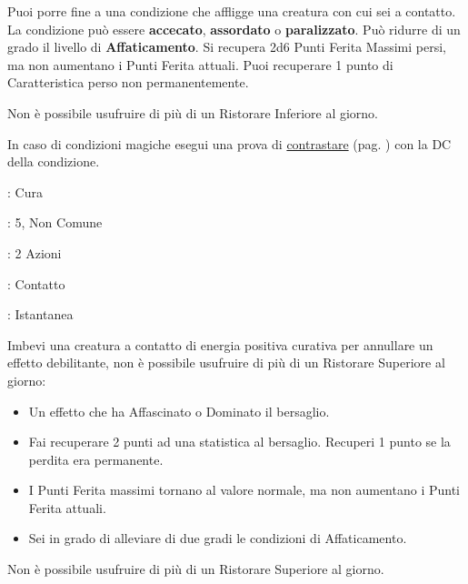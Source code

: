 \begin{multicols}{2}
Puoi porre fine a una condizione che affligge una creatura con cui sei a contatto. La condizione può essere \textbf{accecato}, \textbf{assordato} o \textbf{paralizzato}. Può ridurre di un grado il livello di \textbf{Affaticamento}. Si recupera 2d6 Punti Ferita Massimi persi, ma non aumentano i Punti Ferita attuali. Puoi recuperare 1 punto di Caratteristica perso non permanentemente.

Non è possibile usufruire di più di un Ristorare Inferiore al giorno.

In caso di condizioni magiche esegui una prova di \hyperlink{contrastareincantesimi}{contrastare} (pag. \pageref{contrastareincantesimi}) con la DC della condizione.

\noindent\colorbox{OBSSgold!10}{
\begin{minipage}{0.95\linewidth}
\begin{description}[noitemsep, topsep=0pt, parsep=0pt, partopsep=0pt, leftmargin=0cm, labelwidth=1.3cm]
	\item[\textbf{Lista}]: Cura
	\item[\textbf{Livello}]: 5, Non Comune
	\item[\textbf{Lancio}]: 2 Azioni
	\item[\textbf{Gittata}]: Contatto
	\item[\textbf{Durata}]: Istantanea
\end{description}
\end{minipage}}\smallskip

Imbevi una creatura a contatto di energia positiva curativa per annullare un effetto debilitante, non è possibile usufruire di più di un Ristorare Superiore al giorno:

\begin{itemize}[leftmargin=*] \setlength{\itemsep}{0pt}

	\item Un effetto che ha Affascinato o Dominato il bersaglio.
	\item Fai recuperare 2 punti ad una statistica al bersaglio. Recuperi 1 punto se la perdita era permanente.
	\item I Punti Ferita massimi tornano al valore normale, ma non aumentano i Punti Ferita attuali.
	\item Sei in grado di alleviare di due gradi le condizioni di Affaticamento.
\end{itemize}

Non è possibile usufruire di più di un Ristorare Superiore al giorno.


\end{multicols}
